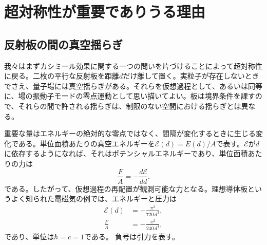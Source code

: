 \chapter{超対称性が重要でありうる理由}


\section{反射板の間の真空揺らぎ}

我々はまずカシミール効果に関する一つの問いを片づけることによって超対称性に戻る。二枚の平行な反射板を距離\(d\)だけ離して置く。実粒子が存在しないときでさえ、量子場には真空揺らぎがある。それらを仮想過程として、あるいは同等に、場の振動子モードの零点運動として思い描いてよい。板は境界条件を課すので、それらの間で許される揺らぎは、制限のない空間における揺らぎとは異なる。

重要な量はエネルギーの絶対的な零点ではなく、間隔が変化するときに生じる変化である。単位面積あたりの真空エネルギーを\(\mathcal E(d)=E(d)/A\)で表す。\(\mathcal E\)が\(d\)に依存するようになれば、それはポテンシャルエネルギーであり、単位面積あたりの力は
\begin{equation}
\frac{F}{A}=-\frac{d\mathcal E}{dd}.
\end{equation}
である。したがって、仮想過程の再配置が観測可能な力となる。理想導体板というよく知られた電磁気の例では、エネルギーと圧力は
\begin{align}
\mathcal E(d)&=-\frac{\pi^2}{720\,d^3},\\
\frac{F}{A}&=-\frac{\pi^2}{240\,d^4},
\end{align}
であり、単位は\(\hbar=c=1\)である。 負号は引力を表す。

\begin{classroomqa}
\end{classroomqa}

